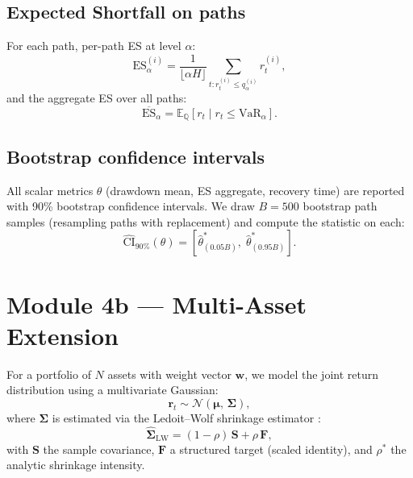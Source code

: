 \documentclass[12pt]{article}
\newcommand{\E}{\mathbb{E}}
\newcommand{\Q}{\mathbb{Q}}
\begin{document}
\subsection{Expected Shortfall on paths}

For each path, per-path ES at level $\alpha$:
\begin{equation}
  \text{ES}_\alpha^{(i)} =
    \frac{1}{\lfloor\alpha H\rfloor}\sum_{t: r_t^{(i)} \leq q_\alpha^{(i)}} r_t^{(i)},
\end{equation}
and the aggregate ES over all paths:
\begin{equation}
  \overline{\text{ES}}_\alpha = \E_\Q\!\left[r_t \mid r_t \leq \text{VaR}_\alpha\right].
\end{equation}

\subsection{Bootstrap confidence intervals}

All scalar metrics $\theta$ (drawdown mean, ES aggregate, recovery time)
are reported with 90\% bootstrap confidence intervals.  We draw
$B = 500$ bootstrap path samples (resampling paths with replacement)
and compute the statistic on each:
\begin{equation}
  \widehat{\text{CI}}_{90\%}(\theta) =
    \left[\hat\theta^*_{(0.05B)},\; \hat\theta^*_{(0.95B)}\right].
\end{equation}

\section{Module 4b — Multi-Asset Extension}

For a portfolio of $N$ assets with weight vector $\mathbf{w}$, we model
the joint return distribution using a multivariate Gaussian:
\begin{equation}
  \mathbf{r}_t \sim \mathcal{N}(\boldsymbol\mu,\, \boldsymbol\Sigma),
\end{equation}
where $\boldsymbol\Sigma$ is estimated via the Ledoit--Wolf shrinkage
estimator \citep{LedoitWolf2004}:
\begin{equation}
  \hat{\boldsymbol\Sigma}_{\text{LW}} =
    (1-\rho)\,\mathbf{S} + \rho\,\mathbf{F},
\end{equation}
with $\mathbf{S}$ the sample covariance, $\mathbf{F}$ a structured target
(scaled identity), and $\rho^*$ the analytic shrinkage intensity.
\end{document}
